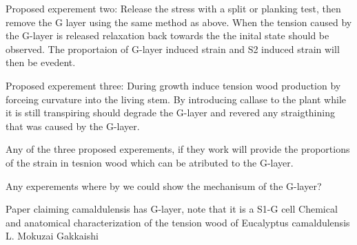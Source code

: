 \documentclass{article}
\begin{document}
Proposed experement two:
Release the stress with a split or planking test, then remove the G
layer using the same method as above. When the tension caused by the G-layer is
released relaxation back towards the the inital state should be observed. The
proportaion of G-layer induced strain and S2 induced strain will then be
evedent.

Proposed experement three:
During growth induce tension wood production by forceing curvature into the
living stem. By introducing callase to the plant while it is still transpiring
should degrade the G-layer and revered any straigthining that was caused by the
G-layer.

Any of the three proposed experements, if they work will provide the proportions
of the strain in tesnion wood which can be atributed to the G-layer.

Any experements where by we could show the mechanisum of the G-layer?

Paper claiming camaldulensis has G-layer, note that it is a S1-G cell
Chemical and anatomical characterization of the tension wood of Eucalyptus
camaldulensis L. Mokuzai Gakkaishi

\end{document}
